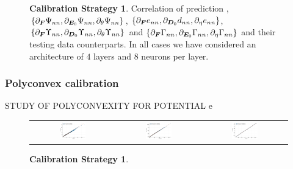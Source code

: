 \begin{figure}[hbtp]
\begin{tabular}{ccc}
	\end{tabular}
	\caption{\textbf{Calibration Strategy 1}. Correlation of prediction , $\{\partial_{\boldsymbol{F}}\Psi_{nn},\partial_{\boldsymbol{E}_0}\Psi_{nn},\partial_{\theta}\Psi_{nn}\}$, $\{\partial_{\boldsymbol{F}}e_{nn},\partial_{\boldsymbol{D}_0}d_{nn},\partial_{\eta}e_{nn}\}$, $\{\partial_{\boldsymbol{F}}\Upsilon_{nn},\partial_{\boldsymbol{D}_0}\Upsilon_{nn},\partial_{\theta}\Upsilon_{nn}\}$ and $\{\partial_{\boldsymbol{F}}\Gamma_{nn},\partial_{\boldsymbol{E}_0}\Gamma_{nn},\partial_{\eta}\Gamma_{nn}\}$ and their testing data counterparts. In all cases we have considered an architecture of $4$ layers and $8$ neurons per layer.}
	\label{fig:strategy 1--the potentials}
\end{figure}

\clearpage


\subsubsection{Polyconvex calibration}\label{sec:polyconvexity}

STUDY OF POLYCONVEXITY FOR POTENTIAL e

\begin{figure}[hbtp]
	\centering
	\begin{tabular}{ccc}
		\includegraphics[width=0.33\textwidth]{Figures/PotentialStudy/e_pol_P_CorrelationTest} &
		\includegraphics[width=0.33\textwidth]{Figures/PotentialStudy/e_pol_E0_CorrelationTest} &
		\includegraphics[width=0.33\textwidth]{Figures/PotentialStudy/e_pol_theta_CorrelationTest} \\

	\end{tabular}
	\caption{\textbf{Calibration Strategy 1}.}
	\label{fig:example 1 energy balance}
\end{figure}



